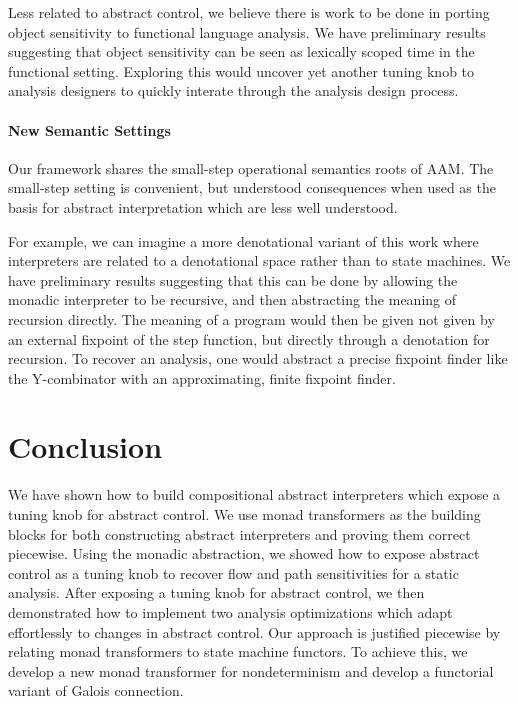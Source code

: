\documentclass{article}
\begin{document}
Less related to abstract control, we believe there is work to be done in porting object sensitivity to functional language analysis.
We have preliminary results suggesting that object sensitivity can be seen as lexically scoped time in the functional setting.
Exploring this would uncover yet another tuning knob to analysis designers to quickly interate through the analysis design process.

\paragraph{New Semantic Settings}
Our framework shares the small-step operational semantics roots of AAM.
The small-step setting is convenient, but understood consequences when used as the basis for abstract interpretation 
  which are less well understood.

For example, we can imagine a more denotational variant of this work where interpreters are related to a denotational space 
  rather than to state machines.
We have preliminary results suggesting that this can be done by allowing the monadic interpreter to be recursive, 
  and then abstracting the meaning of recursion directly.
The meaning of a program would then be given not given by an external fixpoint of the step function, 
  but directly through a denotation for recursion.
To recover an analysis, one would abstract a precise fixpoint finder like the Y-combinator with an approximating, finite fixpoint finder.


\section{Conclusion}
\label{Conclusion}

We have shown how to build compositional abstract interpreters which expose a tuning knob for abstract control.
We use monad transformers as the building blocks for both constructing abstract interpreters and proving them correct piecewise.
Using the monadic abstraction, we showed how to expose abstract control as a tuning knob to recover flow and path sensitivities 
  for a static analysis.
After exposing a tuning knob for abstract control, we then demonstrated how to implement two analysis optimizations which adapt effortlessly to changes in abstract control.
Our approach is justified piecewise by relating monad transformers to state machine functors.
To achieve this, we develop a new monad transformer for nondeterminism and develop a functorial variant of Galois connection.
\end{document}
